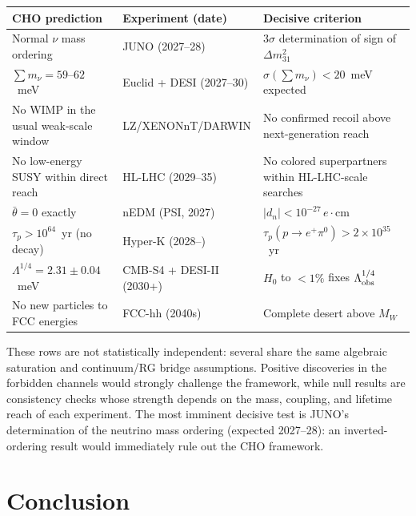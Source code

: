 \documentclass[12pt,a4paper]{article}
\theoremstyle{definition}
\theoremstyle{remark}
\begin{document}
\begin{center}
\begin{tabular}{p{5.5cm}p{3.2cm}p{4.5cm}}
\hline
\textbf{CHO prediction} & \textbf{Experiment (date)} & \textbf{Decisive criterion} \\
\hline
Normal $\nu$ mass ordering & JUNO (2027--28) & 
$3\sigma$ determination of sign of $\Delta m^2_{31}$ \\[3pt]
$\sum m_\nu = 59$--$62$~meV & Euclid + DESI (2027--30) & 
$\sigma(\sum m_\nu) < 20$~meV expected \\[3pt]
No WIMP in the usual weak-scale window & LZ/XENONnT/DARWIN & 
No confirmed recoil above next-generation reach \\[3pt]
No low-energy SUSY within direct reach & HL-LHC (2029--35) & 
No colored superpartners within HL-LHC-scale searches \\[3pt]
$\bar\theta = 0$ exactly & nEDM (PSI, 2027) & 
$|d_n| < 10^{-27}\,e\cdot$cm \\[3pt]
$\tau_p > 10^{64}$~yr (no decay) & Hyper-K (2028--) & 
$\tau_p(p\to e^+\pi^0) > 2\times 10^{35}$~yr \\[3pt]
$\Lambda^{1/4} = 2.31 \pm 0.04$~meV & CMB-S4 + DESI-II (2030+) &
$H_0$ to $<1\%$ fixes $\Lambda^{1/4}_{\rm obs}$ \\[3pt]
No new particles to FCC energies & FCC-hh (2040s) & 
Complete desert above $M_W$ \\
\hline
\end{tabular}
\end{center}

\noindent These rows are not statistically independent: several share the same 
algebraic saturation and continuum/RG bridge assumptions. Positive discoveries 
in the forbidden channels would strongly challenge the framework, while null 
results are consistency checks whose strength depends on the mass, coupling, 
and lifetime reach of each experiment. The most imminent 
decisive test is JUNO's determination of the neutrino mass ordering 
(expected 2027--28): an inverted-ordering result would immediately 
rule out the CHO framework.

\section{Conclusion}
\end{document}
